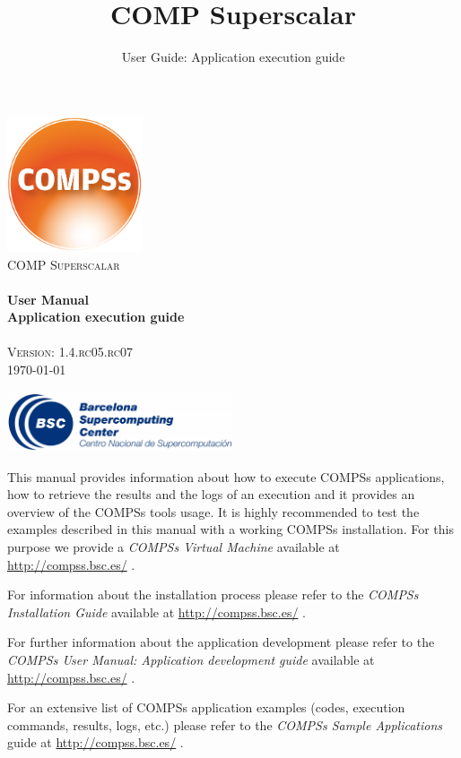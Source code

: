 \documentclass[a4paper,12pt]{article}
\title{COMP Superscalar}
\author{User Guide: Application execution guide}
\def \compssversion {1.4.rc05.rc07}
\begin{document}
  \hypersetup{pageanchor=false}
  \begin{titlepage} 
    \begin{center} 
      \includegraphics[width=0.3\textwidth]{./Figures/Logos/degradado-naranja-compss.jpg}~\\[1cm] 
      \textsc{\LARGE COMP Superscalar}\\[1.5cm] 
      
      \HRule \\[0.4cm] 
      { \huge \bfseries User Manual \\[0.4cm] }
      { \large \bfseries Application execution guide \\[0.4cm] } 
      \HRule \\[1.5cm] 

      { \large \textsc{Version: \compssversion}} \\[0.3cm]
      { \large \today } 
      
      \vfill 
      \includegraphics[width=0.5\textwidth]{./Figures/bsc_280.jpg}~\\[1cm]
    \end{center} 
  \end{titlepage}
  \hypersetup{pageanchor=true}
  
  {
    This manual provides information about how to execute COMPSs applications, how to retrieve the results and the logs of an execution and it provides an overview of the COMPSs tools usage. It is highly recommended to test the examples described in this manual with a working COMPSs installation. For this purpose we provide a \textit{COMPSs Virtual Machine} available at \url{http://compss.bsc.es/} .
    \newline
    
    For information about the installation process please refer to the \textit{COMPSs Installation Guide} available at
    \url{http://compss.bsc.es/} .
    \newline
    
    For further information about the application development please refer to the \textit{COMPSs User Manual: Application development
    guide} available at \url{http://compss.bsc.es/} .
    \newline
    
    For an extensive list of COMPSs application examples (codes, execution commands, results, logs, etc.) please refer to the \textit{COMPSs Sample 
    Applications} guide at \url{http://compss.bsc.es/} .
  }
  
\end{document}
